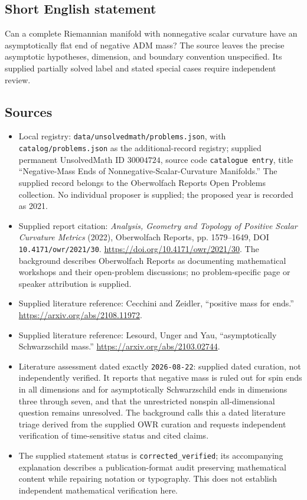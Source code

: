 \documentclass[11pt]{article}
\begin{document}
\subsection{Short English statement}
Can a complete Riemannian manifold with nonnegative scalar curvature have an asymptotically flat end of negative ADM mass? The source leaves the precise asymptotic hypotheses, dimension, and boundary convention unspecified. Its supplied partially solved label and stated special cases require independent review.
\subsection{Sources}
\begin{itemize}
\item Local registry: \texttt{data/unsolvedmath/problems.json}, with \texttt{catalog/problems.json} as the additional-record registry; supplied permanent UnsolvedMath ID \(30004724\), source code \texttt{catalogue entry}, title ``Negative-Mass Ends of Nonnegative-Scalar-Curvature Manifolds.'' The supplied record belongs to the Oberwolfach Reports Open Problems collection. No individual proposer is supplied; the proposed year is recorded as 2021.
\item Supplied report citation: \emph{Analysis, Geometry and Topology of Positive Scalar Curvature Metrics} (2022), Oberwolfach Reports, pp. 1579--1649, DOI \texttt{10.4171/owr/2021/30}. \url{https://doi.org/10.4171/owr/2021/30}. The background describes Oberwolfach Reports as documenting mathematical workshops and their open-problem discussions; no problem-specific page or speaker attribution is supplied.
\item Supplied literature reference: Cecchini and Zeidler, ``positive mass for ends.'' \url{https://arxiv.org/abs/2108.11972}.
\item Supplied literature reference: Lesourd, Unger and Yau, ``asymptotically Schwarzschild mass.'' \url{https://arxiv.org/abs/2103.02744}.
\item Literature assessment dated exactly \texttt{2026-08-22}: supplied dated curation, not independently verified. It reports that negative mass is ruled out for spin ends in all dimensions and for asymptotically Schwarzschild ends in dimensions three through seven, and that the unrestricted nonspin all-dimensional question remains unresolved. The background calls this a dated literature triage derived from the supplied OWR curation and requests independent verification of time-sensitive status and cited claims.
\item The supplied statement status is \texttt{corrected\_verified}; its accompanying explanation describes a publication-format audit preserving mathematical content while repairing notation or typography. This does not establish independent mathematical verification here.
\end{itemize}
\end{document}
